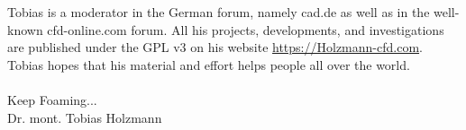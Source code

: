 Tobias is a moderator in the German \OF forum, namely cad.de as well
as in the well-known cfd-online.com forum. All his projects, developments, and
investigations are published under the GPL v3 on his website
\url{https://Holzmann-cfd.com}. Tobias hopes that his material and effort helps
people all over the world.
\\~\\
Keep Foaming...\\
Dr. mont. Tobias Holzmann


